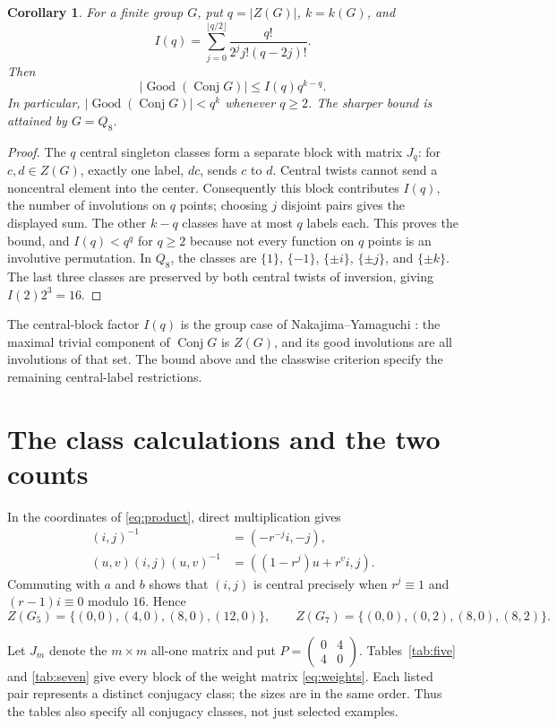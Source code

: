 \documentclass[11pt]{article}
\newtheorem{corollary}[theorem]{Corollary}
\newcommand{\Good}{\operatorname{Good}}
\newcommand{\Conj}{\operatorname{Conj}}
\begin{document}
\begin{corollary}\label{cor:center}
For a finite group $G$, put $q=|Z(G)|$, $k=k(G)$, and
\[
 I(q)=\sum_{j=0}^{\lfloor q/2\rfloor}
       \frac{q!}{2^j j!(q-2j)!}.
\]
Then
\[
 |\Good(\Conj G)|\le I(q)q^{k-q}.
\]
In particular, $|\Good(\Conj G)|<q^k$ whenever $q\ge2$.
The sharper bound is attained by $G=Q_8$.
\end{corollary}
\begin{proof}
The $q$ central singleton classes form a separate block with matrix
$J_q$: for $c,d\in Z(G)$, exactly one label, $dc$, sends $c$ to $d$.
Central twists cannot send a noncentral element into the center.
Consequently this block contributes $I(q)$, the number of involutions
on $q$ points; choosing $j$ disjoint pairs gives the displayed sum.
The other $k-q$ classes have at most $q$ labels each. This proves the
bound, and $I(q)<q^q$ for $q\ge2$ because not every function on $q$
points is an involutive permutation.
In $Q_8$, the classes are $\{1\}$, $\{-1\}$,
$\{\pm i\}$, $\{\pm j\}$, and $\{\pm k\}$.
The last three classes are preserved by both central twists of
inversion, giving $I(2)2^3=16$.
\end{proof}

The central-block factor $I(q)$ is the group case of
Nakajima--Yamaguchi \cite[Theorems 1.1 and 3.3]{NY}: the maximal
trivial component of $\Conj G$ is $Z(G)$, and its good involutions
are all involutions of that set. The bound above and the classwise
criterion specify the remaining central-label restrictions.

\section{The class calculations and the two counts}
In the coordinates of \eqref{eq:product}, direct multiplication gives
\begin{align}
 (i,j)^{-1}&=(-r^{-j}i,-j),\label{eq:inverse}\\
 (u,v)(i,j)(u,v)^{-1}&=((1-r^j)u+r^v i,j).\label{eq:conjugacy}
\end{align}
Commuting with $a$ and $b$ shows that $(i,j)$ is central precisely when
$r^j\equiv1$ and $(r-1)i\equiv0$ modulo $16$. Hence
\[
 Z(G_5)=\{(0,0),(4,0),(8,0),(12,0)\},\qquad
 Z(G_7)=\{(0,0),(0,2),(8,0),(8,2)\}.
\]

Let $J_m$ denote the $m\times m$ all-one matrix and put
$P=\left(\begin{smallmatrix}0&4\\4&0\end{smallmatrix}\right)$.
Tables~\ref{tab:five} and \ref{tab:seven} give every block of the
weight matrix \eqref{eq:weights}. Each listed pair represents a distinct
conjugacy class; the sizes are in the same order. Thus the tables also
specify all conjugacy classes, not just selected examples.
\end{document}
